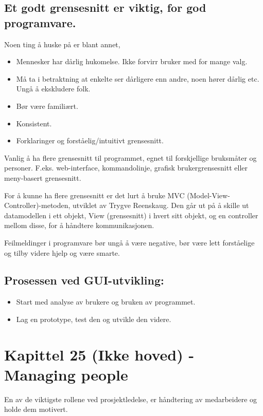 \documentclass[11pt]{article}
\begin{document}
\subsection{Et godt grensesnitt er viktig, for god programvare.}
\label{sec-15.1}

   Noen ting å huske på er blant annet,

\begin{itemize}
\item Mennesker har dårlig hukomelse. Ikke forvirr bruker med for mange valg.
\item Må ta i betraktning at enkelte ser dårligere enn andre, noen hører dårlig etc. Ungå å ekskludere folk.
\item Bør være familiært.
\item Konsistent.
\item Forklaringer og forståelig/intuitivt grensesnitt.
\end{itemize}

  Vanlig å ha flere grensesnitt til programmet, 
  egnet til forskjellige bruksmåter og personer. F.eks. web-interface, 
  kommandolinje, grafisk brukergrensesnitt eller meny-basert grensesnitt.

  For å kunne ha flere grensesnitt er det lurt å bruke MVC (Model-View-Controller)-metoden, utviklet av Trygve Reenskaug. 
  Den går ut på å skille ut datamodellen i ett objekt, View (grensesnitt) i hvert sitt objekt, 
  og en controller mellom disse, for å håndtere kommunikasjonen.

  Feilmeldinger i programvare bør ungå å være negative, bør være lett forståelige og tilby videre hjelp og være smarte.
\subsection{Prosessen ved GUI-utvikling:}
\label{sec-15.2}

\begin{itemize}
\item Start med analyse av brukere og bruken av programmet.
\item Lag en prototype, test den og utvikle den videre.
\end{itemize}
\section{Kapittel 25 (Ikke hoved) - Managing people}
\label{sec-16}

  En av de viktigste rollene ved prosjektledelse, er håndtering av medarbeidere og holde dem motivert.
\end{document}
